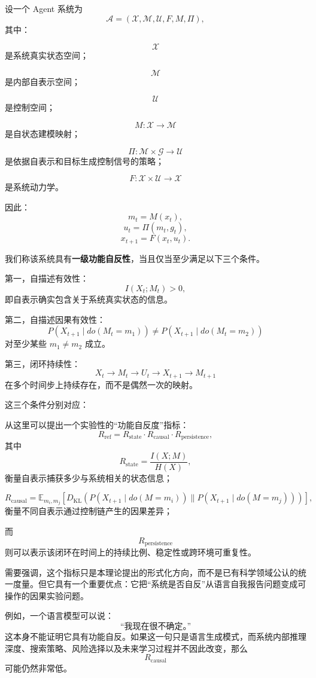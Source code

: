 设一个 Agent 系统为
\[
\mathcal A
=
(
\mathcal X,
\mathcal M,
\mathcal U,
F,
M,
\Pi
),
\]
其中：

\[
\mathcal X
\]
是系统真实状态空间；

\[
\mathcal M
\]
是内部自表示空间；

\[
\mathcal U
\]
是控制空间；

\[
M:\mathcal X\rightarrow\mathcal M
\]
是自状态建模映射；

\[
\Pi:\mathcal M\times\mathcal G\rightarrow\mathcal U
\]
是依据自表示和目标生成控制信号的策略；

\[
F:\mathcal X\times\mathcal U\rightarrow\mathcal X
\]
是系统动力学。

因此：
\[
m_t=M(x_t),
\]
\[
u_t=\Pi(m_t,g_t),
\]
\[
x_{t+1}=F(x_t,u_t).
\]

我们称该系统具有\textbf{一级功能自反性}，当且仅当至少满足以下三个条件。

第一，自描述有效性：
\[
I(X_t;M_t)>0,
\]
即自表示确实包含关于系统真实状态的信息。

第二，自描述因果有效性：
\[
P(X_{t+1}\mid do(M_t=m_1))
\neq
P(X_{t+1}\mid do(M_t=m_2))
\]
对至少某些 \(m_1\neq m_2\) 成立。

第三，闭环持续性：
\[
X_t
\rightarrow
M_t
\rightarrow
U_t
\rightarrow
X_{t+1}
\rightarrow
M_{t+1}
\]
在多个时间步上持续存在，而不是偶然一次的映射。

这三个条件分别对应：
\begin{statementbox}
\centering
{}
\end{statementbox}

从这里可以提出一个实验性的“功能自反度”指标：
\[
R_{\mathrm{ref}}
=
R_{\mathrm{state}}
\cdot
R_{\mathrm{causal}}
\cdot
R_{\mathrm{persistence}},
\]
其中
\[
R_{\mathrm{state}}
=
\frac{I(X;M)}
{H(X)},
\]
衡量自表示捕获多少与系统相关的状态信息；

\[
R_{\mathrm{causal}}
=
\mathbb E_{m_i,m_j}
\left[
D_{\mathrm{KL}}
\left(
P(X_{t+1}\mid do(M=m_i))
\|
P(X_{t+1}\mid do(M=m_j))
\right)
\right],
\]
衡量不同自表示通过控制链产生的因果差异；

而
\[
R_{\mathrm{persistence}}
\]
则可以表示该闭环在时间上的持续比例、稳定性或跨环境可重复性。

需要强调，这个指标只是本理论提出的形式化方向，而不是已有科学领域公认的统一度量。但它具有一个重要优点：它把“系统是否自反”从语言自我报告问题变成可操作的因果实验问题。

例如，一个语言模型可以说：
\[
\text{“我现在很不确定。”}
\]
这本身不能证明它具有功能自反。如果这一句只是语言生成模式，而系统内部推理深度、搜索策略、风险选择以及未来学习过程并不因此改变，那么
\[
R_{\mathrm{causal}}
\]
可能仍然非常低。

